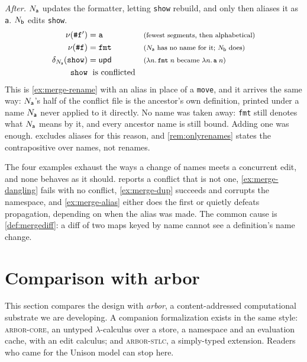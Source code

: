 \documentclass[11pt]{article}
\theoremstyle{definition}
\theoremstyle{plain}
\theoremstyle{remark}
\newcommand{\arborcore}{\textsc{arbor-core}}
\newcommand{\arborstlc}{\textsc{arbor-stlc}}
\begin{document}
\emph{After.} $N_{\mathsf{a}}$ updates the formatter, letting \texttt{show} rebuild, and only then aliases it as
\texttt{a}. $N_{\mathsf{b}}$ edits \texttt{show}.
\[
\begin{array}{r@{\;}l@{\quad}l}
  \namer(\texttt{\#f}') &= \texttt{a}
    & \just{fewest segments, then alphabetical} \\[3pt]
  \namer(\texttt{\#f}) &= \texttt{fmt}
    & \just{$\NA$ has no name for it; $\NB$ does} \\[3pt]
  \delta_{\NA}(\texttt{show}) &= \dupd
    & \just{$\ulam{n}{\uapp{\uvar{\texttt{fmt}}}{\uvar n}}$ became $\ulam{n}{\uapp{\uvar{\texttt{a}}}{\uvar n}}$} \\[3pt]
  \texttt{show} &\text{ is conflicted} &
\end{array}
\]
This is \cref{ex:merge-rename} with an alias in place of a \texttt{move}, and it arrives the same way:
$N_{\mathsf{a}}$'s half of the conflict file is the ancestor's own definition, printed under a name $N_{\mathsf{a}}$ never
applied to it directly. No name was taken away: \texttt{fmt} still denotes what $N_{\mathsf{a}}$ means by it,
and every ancestor name is still bound. Adding one was enough.  excludes
aliases for this reason, and \cref{rem:onlyrenames} states the contrapositive over names, not renames.

The four examples exhaust the ways a change of names meets a concurrent edit, and none behaves as it
should.  reports a conflict that is not one, \cref{ex:merge-dangling} fails with
no conflict, \cref{ex:merge-dup} succeeds and corrupts the namespace, and \cref{ex:merge-alias} either
does the first or quietly defeats propagation, depending on when the alias was made. The common cause
is \cref{def:mergediff}: a diff of two maps keyed by name cannot see a definition's name change.


\section{Comparison with arbor}\label{sec:contrast}

This section compares the design with \emph{arbor}, a content-addressed computational substrate we
are developing. A companion formalization exists in the same style: \arborcore{}, an untyped
$\lambda$-calculus over a store, a namespace and an evaluation cache, with an edit calculus; and
\arborstlc{}, a simply-typed extension. Readers who came for the Unison model can stop here.
\end{document}
